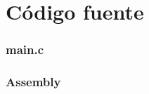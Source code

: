 \documentclass[10pt,a4paper]{article}
\begin{document}
\section{Código fuente}\label{appendix_codigo_fuente}

\subsubsection{main.c}\label{main}


\newpage

\subsubsection{Assembly}\label{main.s}

\end{document}
